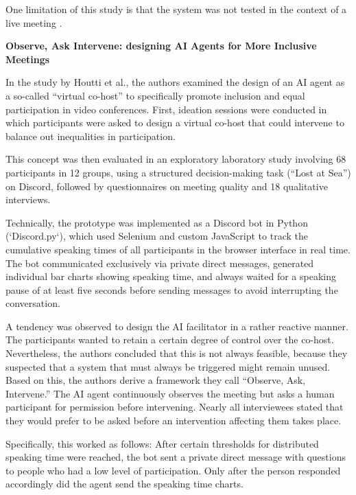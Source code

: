 One limitation of this study is that the system was not tested in the context of a live meeting
.

\textbf{Observe, Ask Intervene: designing AI Agents for More Inclusive Meetings}

In the study by Houtti et al., the authors examined the design of an AI agent as a so-called “virtual
co-host” to specifically promote inclusion and equal participation in video conferences.\cite
{houttiObserveAskIntervene2025}
First, ideation sessions were conducted in which participants were asked to design a virtual co-host
that could intervene to balance out inequalities in participation. \cite[p.
6]{houttiObserveAskIntervene2025}

This concept was then evaluated in an exploratory laboratory study involving 68 participants in 12
groups, using a structured decision-making task (“Lost at Sea”) on Discord, followed by questionnaires
on meeting quality and 18 qualitative interviews. \cite[p. 14]{houttiObserveAskIntervene2025}

Technically, the prototype was implemented as a Discord bot in Python (`Discord.py`), which used Selenium and
custom JavaScript to track the cumulative speaking times of all participants in the browser interface in
real time. The bot communicated exclusively via private direct messages, generated
individual bar charts showing speaking time, and always waited for a speaking pause of
at least five seconds before sending messages to avoid interrupting the conversation.
\cite[p.6]{houttiObserveAskIntervene2025}

A tendency was observed to design the AI facilitator in a rather reactive manner. The participants wanted to retain a
certain degree of control over the co-host. \cite[p.6]{houttiObserveAskIntervene2025} Nevertheless, the
authors concluded that this is not always feasible, because they suspected that a system that
must always be triggered might remain unused.
Based on this, the authors derive a framework they call “Observe, Ask, Intervene.”
The AI agent continuously observes the meeting but asks a human participant for permission before intervening.
Nearly all interviewees stated that they would prefer to be asked before an intervention affecting them takes
place. \cite[p.15] {houttiObserveAskIntervene2025}

Specifically, this worked as follows: After certain thresholds for distributed speaking time were reached,
the bot sent a private direct message with questions to people who had a low level of participation. Only
after the person responded accordingly did the agent send the speaking time charts.

